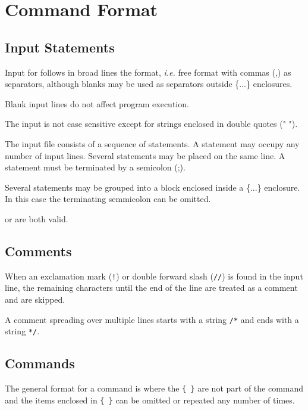 
\chapter{Command Format}


\section{Input Statements}

Input for \madx follows in broad lines the
\href{http://cern.ch/mad9}{\madnine} format, \textsl{i.e.} 
free format with commas (,) as separators, although blanks may be used as
separators outside \{...\} enclosures. 

Blank input lines do not affect program execution. 

The input is not case sensitive except for strings enclosed in double
quotes (" "). 

The input file consists of a sequence of statements. 
A statement may occupy any number of input lines. 
Several statements may be placed on the same line.
A statement must be terminated by a semicolon (;).

Several statements may be grouped into a block enclosed inside a \{...\}
enclosure. In this case the terminating semmicolon can be omitted.

or
are both valid.

\section{Comments}
When an exclamation mark (\texttt{!}) or double forward slash (\texttt{//}) is
found in the input line, the remaining characters until the end of the
line are treated as a comment and are skipped. 

A comment spreading over multiple lines starts with a string \texttt{/*}
and ends with a string \texttt{*/}.

\section{Commands}
The general format for a command is 
where the  \texttt{\{ \}} are not part of the command and the items
enclosed in \texttt{\{ \}} can be omitted or repeated any number of times. 


